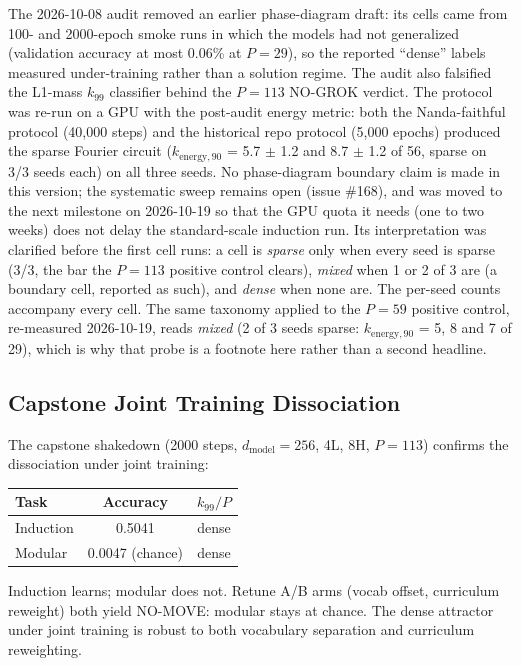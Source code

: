 \documentclass[11pt]{article}
\begin{document}
The 2026-10-08 audit removed an earlier phase-diagram draft: its cells came
from 100- and 2000-epoch smoke runs in which the models had not generalized
(validation accuracy at most 0.06\% at $P=29$), so the reported
``dense'' labels measured under-training rather than a solution regime. The
audit also falsified the L1-mass $k_{99}$ classifier behind the $P=113$
NO-GROK verdict. The protocol was re-run on a GPU with the post-audit energy
metric: both the Nanda-faithful protocol (40{,}000 steps) and the historical
repo protocol (5{,}000 epochs) produced the sparse Fourier circuit
($k_{\mathrm{energy},90}$ = 5.7 $\pm$ 1.2 and 8.7 $\pm$ 1.2 of 56, sparse on
3/3 seeds each) on all three seeds. No phase-diagram boundary claim is made
in this version; the systematic sweep remains open (issue \#168), and was
moved to the next milestone on 2026-10-19 so that the GPU quota it needs
(one to two weeks) does not delay the standard-scale induction run. Its
interpretation was clarified before the first cell runs: a cell is
\emph{sparse} only when every seed is sparse (3/3, the bar the $P=113$
positive control clears), \emph{mixed} when 1 or 2 of 3 are (a boundary
cell, reported as such), and \emph{dense} when none are. The per-seed
counts accompany every cell. The same taxonomy applied to the $P=59$
positive control, re-measured 2026-10-19, reads \emph{mixed} (2 of 3
seeds sparse: $k_{\mathrm{energy},90}$ = 5, 8 and 7 of 29), which is why
that probe is a footnote here rather than a second headline.

\subsection{Capstone Joint Training Dissociation}
The capstone shakedown (2000 steps, $d_\text{model}=256$, 4L, 8H, $P=113$)
confirms the dissociation under joint training:

\begin{center}
\begin{tabular}{lcc}
\toprule
Task & Accuracy & $k_{99}/P$ \\
\midrule
Induction & 0.5041 & dense \\
Modular & 0.0047 (chance) & dense \\
\bottomrule
\end{tabular}
\end{center}

Induction learns; modular does not. Retune A/B arms (vocab offset,
curriculum reweight) both yield NO-MOVE: modular stays at chance. The
dense attractor under joint training is robust to both vocabulary
separation and curriculum reweighting.
\end{document}
